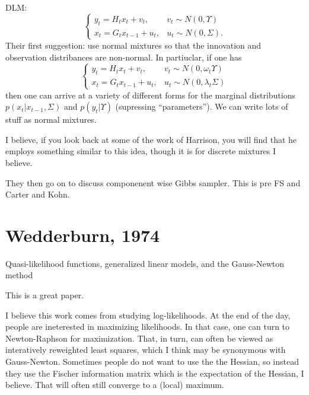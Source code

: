 \documentclass{article}
\begin{document}
DLM:
\[
\begin{cases}
y_t = H_t x_t + v_t, & v_t \sim N(0, \Upsilon) \\
x_t = G_t x_{t-1} + u_t, & u_t \sim N(0, \Sigma).
\end{cases}
\]
Their first suggestion: use normal mixtures so that the innovation and
observation distribances are non-normal.  In partiuclar, if one has
\[
\begin{cases}
y_t = H_t x_t + v_t, & v_t \sim N(0, \omega_t \Upsilon) \\
x_t = G_t x_{t-1} + u_t, & u_t \sim N(0, \lambda_t \Sigma)
\end{cases}
\]
then one can arrive at a variety of different forms for the marginal
distributions $p(x_t | x_{t-1}, \Sigma)$ and $p(y_t | \Upsilon)$ (supressing
``parameters'').  We can write lots of stuff as normal mixtures.

I believe, if you look back at some of the work of Harrison, you will find that
he employs something similar to this idea, though it is for discrete mixtures I
believe.

They then go on to discuss componenent wise Gibbs sampler.  This is pre FS and
Carter and Kohn.

\section{Wedderburn, 1974}

Quasi-likelihood functions, generalized linear models, and the Gauss-Newton method

This is a great paper.

I believe this work comes from studying log-likelihoods.  At the end of the day,
people are ineterested in maximizing likelihoods.  In that case, one can turn to
Newton-Raphson for maximization.  That, in turn, can often be viewed as
interatively reweighted least squares, which I think may be synonymous with
Gauss-Newton.  Sometimes people do not want to use the the Hessian, so instead
they use the Fischer information matrix which is the expectation of the Hessian,
I believe.  That will often still converge to a (local) maximum.
\end{document}

